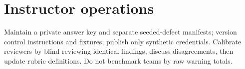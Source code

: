\documentclass[10pt,letterpaper]{article}
\begin{document}
\section{Instructor operations}
Maintain a private answer key and separate seeded-defect manifests; version control instructions and fixtures; publish only synthetic credentials. Calibrate reviewers by blind-reviewing identical findings, discuss disagreements, then update rubric definitions. Do not benchmark teams by raw warning totals.
\end{document}
